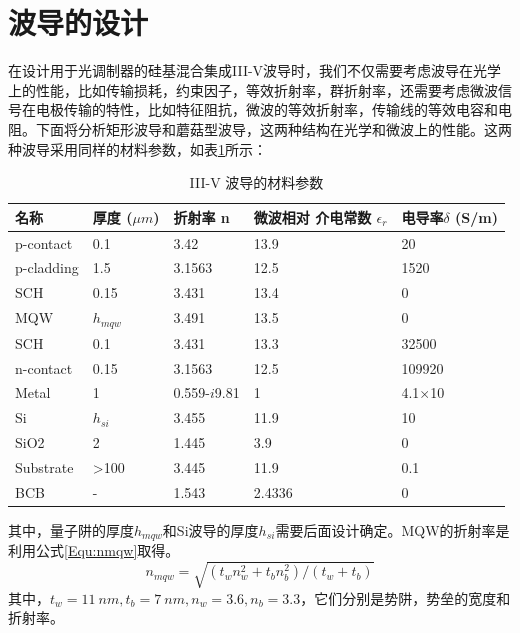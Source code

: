\section{波导的设计}
在设计用于光调制器的硅基混合集成III-V波导时，我们不仅需要考虑波导在光学上的性能，比如传输损耗，约束因子，等效折射率，群折射率，还需要考虑微波信号在电极传输的特性，比如特征阻抗，微波的等效折射率，传输线的等效电容和电阻。下面将分析矩形波导和蘑菇型波导，这两种结构在光学和微波上的性能。这两种波导采用同样的材料参数，如表\ref{epi_structure}\cite{yongbophd}所示：
{
	\begin{table}[htb]
		\caption{III-V 波导的材料参数}
		\label{epi_structure}
		\centering
		\begin{tabular}[t]{lllll}
			\hline
			名称 & 厚度 ($\mu m$) & 折射率 n& \tabincell{l}{微波相对 \\ 介电常数 $\epsilon_r$} & 电导率$\delta$ (S/m) \\
			\hline
			p-contact & 0.1 & 3.42 & 13.9 & 20 \\
			p-cladding  & 1.5 & 3.1563 & 12.5 & 1520 \\
			SCH & 0.15 & 3.431 & 13.4 & 0 \\
			MQW & $h_{mqw}$ & 3.491 & 13.5 & 0 \\
			SCH & 0.1 & 3.431 & 13.3 & 32500\\
			n-contact & 0.15 & 3.1563 & 12.5 & 109920 \\
			Metal & 1 & 0.559-$i$9.81 & 1 & 4.1$\times$10\SP{7}\\
			Si & $h_{si}$&3.455 & 11.9 & 10  \\
			SiO2 & 2 & 1.445 & 3.9 & 0\\
			Substrate & >100 & 3.445 & 11.9 & 0.1\\
			BCB & - &1.543 & 2.4336 &0 \\
			\hline
		\end{tabular}
	\end{table}
}
其中，量子阱的厚度$h_{mqw}$和Si波导的厚度$h_{si}$需要后面设计确定。MQW的折射率是利用公式\ref{Equ:nmqw}取得。
\begin{equation}
\label{Equ:nmqw}
n_{mqw}=\sqrt{(t_w n_w^2+t_b n_b^2)/(t_w+t_b)}
\end{equation}
其中，$t_w = 11~nm, t_b =7~nm, n_w = 3.6, n_b = 3.3$，它们分别是势阱，势垒的宽度和折射率。
